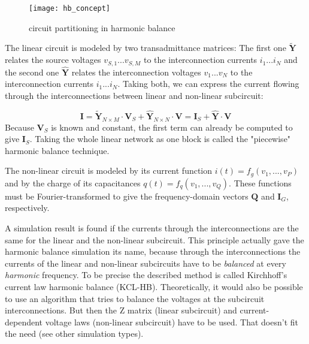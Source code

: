 \begin{figure}[ht]
\begin{center}
\texttt{[image: hb\_concept]}
\end{center}
\caption{circuit partitioning in harmonic balance}
\label{fig:hb_concept}
\end{figure}
\FloatBarrier

The linear circuit is modeled by two transadmittance matrices:
The first one $\tilde{\boldsymbol{Y}}$
relates the source voltages $v_{S,1}...v_{S,M}$ to the interconnection
currents $i_1...i_N$ and the second one $\hat{\boldsymbol{Y}}$
relates the interconnection
voltages $v_1...v_N$ to the interconnection currents $i_1...i_N$.
Taking both, we can express the current flowing through the
interconnections between linear and non-linear subcircuit:

\begin{equation}
\label{eqn:HBlin}
\boldsymbol{I}
  = \boldsymbol{\tilde{Y}}_{N\times M}\cdot \boldsymbol{V}_S +
    \boldsymbol{\hat{Y}}_{N\times N}\cdot \boldsymbol{V}
  = \boldsymbol{I}_S + \boldsymbol{\hat{Y}}\cdot \boldsymbol{V}
\end{equation}
Because $\boldsymbol{V}_S$ is known and constant, the first term
can already be computed to give $\boldsymbol{I}_S$. Taking the
whole linear network as one block is called the "piecewise"
harmonic balance technique.

\addvspace{12pt}

The non-linear circuit is modeled by its current function
$i(t) = f_g(v_1, ..., v_P)$
and by the charge of its capacitances
$q(t) = f_q(v_1, ..., v_Q)$.
These functions must be Fourier-transformed to give the
frequency-domain vectors $\boldsymbol{Q}$ and $\boldsymbol{I}_G$,
respectively.

\addvspace{12pt}

A simulation result is found if the currents through the
interconnections are the same for the linear and the non-linear
subcircuit. This principle actually gave the harmonic balance
simulation its name, because through the interconnections the
currents of the linear and non-linear subcircuits have to be
\textit{balanced} at every \textit{harmonic} frequency. To
be precise the described method is called Kirchhoff's current
law harmonic balance (KCL-HB). Theoretically, it would also be
possible to use an algorithm that tries to balance the voltages
at the subcircuit interconnections. But then the Z matrix (linear
subcircuit) and current-dependent voltage laws (non-linear
subcircuit) have to be used. That doesn't fit the need (see other
simulation types).

